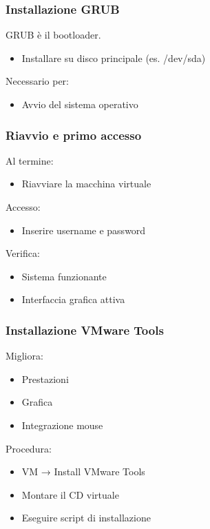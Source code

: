 \documentclass{beamer}
\begin{document}
	
	\begin{frame}
		\frametitle{Installazione GRUB}
		
		GRUB è il bootloader.
		
		\begin{itemize}
			\item Installare su disco principale (es. /dev/sda)
		\end{itemize}
		
		Necessario per:
		\begin{itemize}
			\item Avvio del sistema operativo
		\end{itemize}
		
	\end{frame}
	
	
	\begin{frame}
		\frametitle{Riavvio e primo accesso}
		
		Al termine:
		\begin{itemize}
			\item Riavviare la macchina virtuale
		\end{itemize}
		
		Accesso:
		\begin{itemize}
			\item Inserire username e password
		\end{itemize}
		
		Verifica:
		\begin{itemize}
			\item Sistema funzionante
			\item Interfaccia grafica attiva
		\end{itemize}
		
	\end{frame}
	
	
	\begin{frame}
		\frametitle{Installazione VMware Tools}
		
		Migliora:
		\begin{itemize}
			\item Prestazioni
			\item Grafica
			\item Integrazione mouse
		\end{itemize}
		
		Procedura:
		\begin{itemize}
			\item VM → Install VMware Tools
			\item Montare il CD virtuale
			\item Eseguire script di installazione
		\end{itemize}
		
	\end{frame}
	
\end{document}
